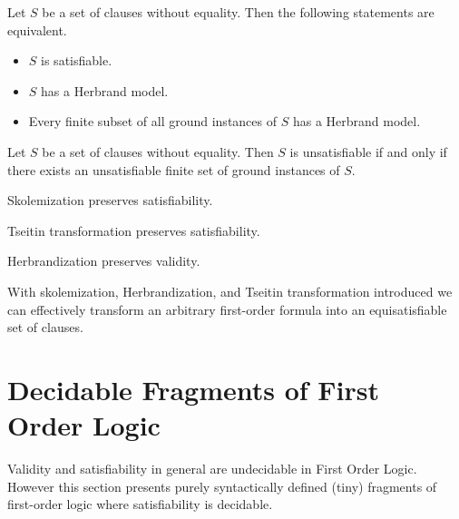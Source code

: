 \begin{theorem}[Herbrand, 1930]\label{the:herbrand}
	Let \( S \) be a set of clauses without equality. Then the following statements are equivalent.
	\begin{itemize}
		\item \( S \) is satisfiable.
		\item \( S \) has a Herbrand model.
		\item Every finite subset of all ground instances of \( S \) has a Herbrand model.
	\end{itemize}
\end{theorem}

\begin{corollary}
	Let \( S \) be a set of clauses without equality.
	Then \( S \) is unsatisfiable if and only if there exists
	an unsatisfiable finite set of ground instances of \( S \).
\end{corollary}

\begin{lemma}
	Skolemization preserves satisfiability.
\end{lemma}

\begin{lemma}
	Tseitin transformation preserves satisfiability.
\end{lemma}

\begin{lemma}
	Herbrandization preserves validity.
\end{lemma}

\begin{lemma}
With skolemization, Herbrandization, and Tseitin transformation introduced 
we can effectively transform an arbitrary first-order formula 
into an equisatisfiable set of clauses.
\end{lemma}


\section{Decidable Fragments of First Order Logic}\label{sec:decidable:fol:fragments}

Validity and satisfiability in general are undecidable in First Order Logic.
However this section presents purely syntactically defined (tiny) fragments
of first-order logic where satisfiability is decidable.%

